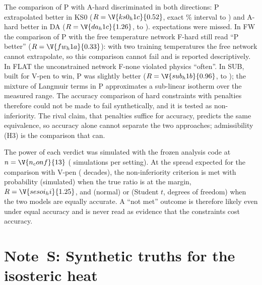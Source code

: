 \documentclass[11pt]{article}
\begin{document}
The comparison of P with A-hard discriminated in both directions: P extrapolated better in KS0
($R = \V{ks0_h1c}{0.52}$, exact \% interval  to ) and
A-hard better in DA ($R = \V{da_h1c}{1.26}$,  to ). 
expectations were missed. In FW the comparison of P with the free temperature network F-hard still read ``P
better'' ($R = \V{fw_h1a}{0.33}$): with two training temperatures the free network cannot extrapolate, so this
comparison cannot fail and is reported descriptively. In FLAT the unconstrained network F-none violated
physics ``often''. In SUB, built for V-pen to win, P was slightly better ($R = \V{sub_h1b}{0.96}$,
 to ); the mixture of Langmuir terms in P approximates a sub-linear isotherm
over the measured range. The accuracy comparison of hard constraints with penalties therefore could not be made to
fail synthetically, and it is tested as non-inferiority. The rival claim, that penalties suffice for accuracy,
predicts the same equivalence, so accuracy alone cannot separate the two approaches; admissibility (H3) is the
comparison that can.

The power of each verdict was simulated with the frozen analysis code at $n = \V{n_conf}{13}$
( simulations per setting). At the spread expected for the comparison with V-pen
( decades), the non-inferiority criterion is met with probability  (simulated) when
the true ratio is at the margin, $R = \V{sesoi_hi}{1.25}$, and  (normal) or
 (Student $t$,  degrees of freedom) when the two models are equally accurate. A
``not met'' outcome is therefore likely even under equal accuracy and is never read as evidence that the
constraints cost accuracy.

\section*{Note~S: Synthetic truths for the isosteric heat}
\end{document}
